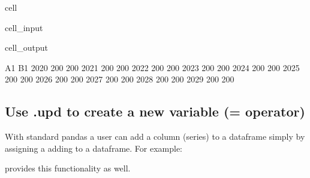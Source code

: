 \documentclass[letterpaper,10pt,english]{jupyterBook}
\begin{document}
\begin{sphinxuseclass}{cell}
\begin{sphinxVerbatimInput}
\begin{sphinxuseclass}{cell_input}
\end{sphinxuseclass}\end{sphinxVerbatimInput}
\begin{sphinxVerbatimOutput}

\begin{sphinxuseclass}{cell_output}
\begin{sphinxVerbatim}[commandchars=\\\{\}]
       A1   B1
2020  200  200
2021  200  200
2022  200  200
2023  200  200
2024  200  200
2025  200  200
2026  200  200
2027  200  200
2028  200  200
2029  200  200
\end{sphinxVerbatim}

\end{sphinxuseclass}\end{sphinxVerbatimOutput}

\end{sphinxuseclass}

\subsection{Use .upd to create a new variable (= operator)}
\label{\detokenize{content/04_PythonEssentials/UpdateCommand:use-upd-to-create-a-new-variable-operator}}
\sphinxAtStartPar
With standard pandas a user can add a column (series) to a dataframe simply by assigning a adding to a dataframe.  For example:

\sphinxAtStartPar
{}

\sphinxAtStartPar
{} provides this functionality as well.
\end{document}
